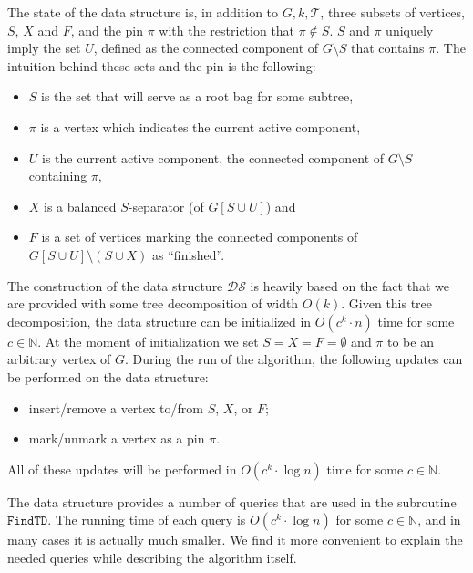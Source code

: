 \documentclass[a4paper,11pt]{article}
\theoremstyle{definition}
\theoremstyle{remark}
\newcommand{\findTD}{\mathtt{FindTD}}
\newcommand{\ds}{\mathcal{DS}}
\newcommand{\pin}{\pi}
\newcommand{\td}{\mathcal{T}} \newcommand{\tw}{\mathrm{tw}} \newcommand{\w}{\mathrm{w}}
\begin{document}
The state of the data structure is, in addition to $G,k,\td$, three
subsets of vertices, $S$, $X$ and $F$, and the pin $\pin$ with the
restriction that $\pin \notin S$.  $S$ and $\pin$ uniquely imply the
set $U$, defined as the connected component of $G\setminus S$ that
contains $\pin$.  The intuition behind these sets and the pin is the
following:

\begin{itemize}
\item $S$ is the set that will serve as a root bag for some subtree,
\item $\pin$ is a vertex which indicates the current active component,
\item $U$ is the current active component, the connected component of
  $G\setminus S$ containing $\pin$,
\item $X$ is a balanced $S$-separator (of $G[S \cup U]$) and
\item $F$ is a set of vertices marking the connected components of
  $G[S \cup U]\setminus (S\cup X)$ as ``finished''.
\end{itemize}

The construction of the data structure $\ds$ is heavily based on the
fact that we are provided with some tree decomposition of width
$O(k)$.  Given this tree decomposition, the data structure can be
initialized in $O(c^k\cdot n)$ time for some $c \in \mathbb{N}$.  At
the moment of initialization we set $S=X=F=\emptyset$ and $\pin$ to be
an arbitrary vertex of $G$.  During the run of the algorithm, the
following updates can be performed on the data structure:
\begin{itemize}
\item insert/remove a vertex to/from $S$, $X$, or $F$;
\item mark/unmark a vertex as a pin $\pin$.
\end{itemize}
All of these updates will be performed in $O(c^k\cdot \log n)$ time
for some $c \in \mathbb{N}$.

The data structure provides a number of queries that are used in the
subroutine $\findTD$.  The running time of each query is $O(c^k \cdot
\log n)$ for some $c \in \mathbb{N}$, and in many cases it is actually
much smaller.  We find it more convenient to explain the needed
queries while describing the algorithm itself.
\end{document}
